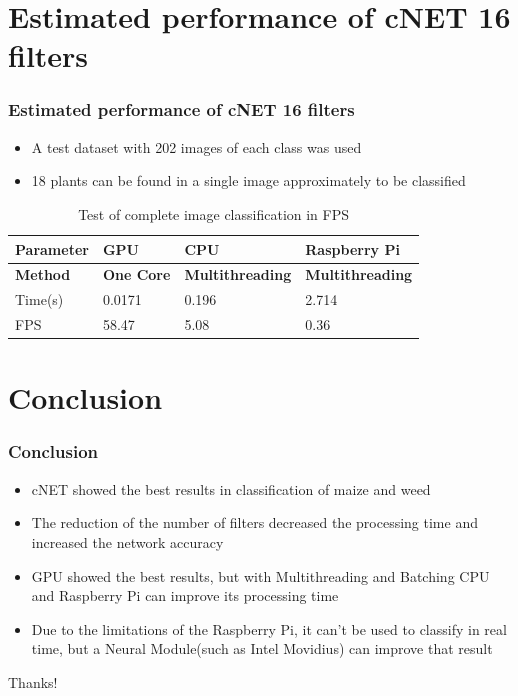 \documentclass[10pt,a4paper]{beamer}
\begin{document}
\section{Estimated performance of cNET 16 filters}
\begin{frame}
\frametitle{Estimated performance of cNET 16 filters}
\begin{itemize}
	\item A test dataset with 202 images of each class was used
	\item 18 plants can be found in a single image approximately to be classified
\end{itemize}
\begin{table}[h!]
\centering
\renewcommand{\arraystretch}{1.2}
\caption{Test of complete image classification in FPS}
\label{table:6}
\begin{tabular}[c c c c]{|p{1.8 cm} p{1.5cm} p{2.1cm} p{2.3cm}|} 
 \hline
 \textbf{Parameter} &\textbf{GPU } & \textbf{CPU} & \textbf{Raspberry Pi} \\ 
 \hline
  \textbf{Method} &\textbf{One Core} & \textbf{Multithreading} & \textbf{Multithreading} \\ 
 \hline
 Time(s) & 0.0171 & 0.196 & 2.714 \\ [0.95ex]
 FPS & 58.47 & 5.08 & 0.36 \\ [0.95ex]
 \hline
\end{tabular}
\end{table}
\end{frame}
\section{Conclusion}
\begin{frame}
\frametitle{Conclusion}
\begin{itemize}
\item cNET showed the best results in classification of maize and weed
\item The reduction of the number of filters decreased the processing time and increased the network accuracy 
\item GPU showed the best results, but with Multithreading and Batching CPU and Raspberry Pi can improve its processing time
\item Due to the limitations of the Raspberry Pi, it can't be used to classify in real time, but a Neural Module(such as Intel Movidius) can improve that result
\end{itemize}
\end{frame}
\large
\begin{frame}
\begin{center}
Thanks!
\end{center}
\end{frame}

%
%
\end{document}
